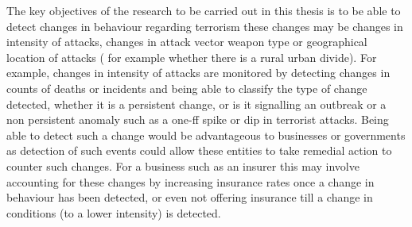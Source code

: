 The key objectives of the research to be carried out in this thesis is to be able to detect changes in behaviour regarding terrorism these changes may be changes in intensity of attacks, changes in attack vector weapon type or geographical location of attacks ( for example whether there is a rural urban divide). For example, changes in intensity of attacks are monitored by detecting changes in counts of deaths or incidents and being able to classify the type of change detected, whether it is a persistent change, or is it signalling an outbreak or a non persistent anomaly such as a one-ff spike or dip in terrorist attacks. Being able to detect such a change would be advantageous to businesses or governments as detection of such events could allow these entities to take remedial action to counter such changes. For a business such as an insurer this may involve accounting for these changes by increasing insurance rates once a change in behaviour has been detected, or even not offering insurance till a change in conditions (to a lower intensity) is detected.